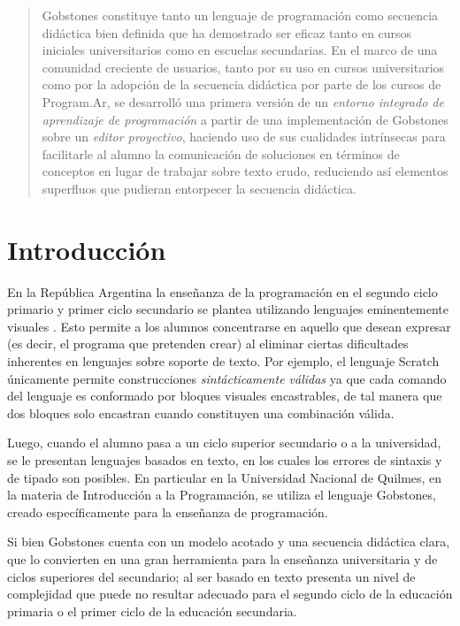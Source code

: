 \begin{abstract}
Gobstones constituye tanto un lenguaje de programación como secuencia didáctica bien definida que ha demostrado ser eficaz tanto en cursos iniciales universitarios como en escuelas secundarias. En el marco de una comunidad creciente de usuarios, tanto por su uso en cursos universitarios como por la adopción de la secuencia didáctica por parte de los cursos de Program.Ar\cite{CuadernoDocenteProgramAR}, se desarrolló una primera versión de un \emph{entorno integrado de aprendizaje de programación} a partir de una implementación de Gobstones sobre un \emph{editor proyectivo}, haciendo uso de sus cualidades intrínsecas para facilitarle al alumno la comunicación de soluciones en términos de conceptos en lugar de trabajar sobre texto crudo, reduciendo así elementos superfluos que pudieran entorpecer la secuencia didáctica.
\end{abstract}



\section{Introducción} \label{intro}

En la República Argentina la enseñanza de la programación en el segundo ciclo primario y primer ciclo secundario se plantea utilizando lenguajes eminentemente visuales \cite{CuadernoDocenteProgramAR}. Esto permite a los alumnos concentrarse en aquello que desean expresar (es decir, el programa que pretenden crear) al eliminar ciertas dificultades inherentes en lenguajes sobre soporte de texto. Por ejemplo, el lenguaje Scratch\cite{scratch}\cite{Maloney_scratch} únicamente permite construcciones \textit{sintácticamente válidas} ya que cada comando del lenguaje es conformado por bloques visuales encastrables, de tal manera que dos bloques solo encastran cuando constituyen una combinación válida.

Luego, cuando el alumno pasa a un ciclo superior secundario o a la universidad, se le presentan lenguajes basados en texto, en los cuales los errores de sintaxis y de tipado son posibles. En particular en la Universidad Nacional de Quilmes, en la materia de Introducción a la Programación, se utiliza el lenguaje Gobstones\cite{Gobstones}, creado específicamente para la enseñanza de programación.

Si bien Gobstones cuenta con un modelo acotado y una secuencia didáctica clara, que lo convierten en una gran herramienta para la enseñanza universitaria y de ciclos superiores del secundario\cite{gobstonesEsImportante}; al ser basado en texto presenta un nivel de complejidad que puede no resultar adecuado para el segundo ciclo de la educación primaria o el primer ciclo de la educación secundaria.

